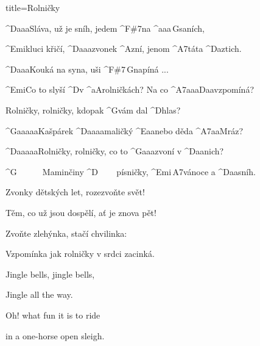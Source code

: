 \begin{song}{title=\predtitle\centering Rolničky \\\large   \vspace*{-0.3cm}}  %
\begin{centerjustified}
\nejnejvetsi

\sloka
	^{D{\color{white}aaa}}Sláva, už je sníh, jedem ^{F\#7}na ^{{\color{white}aaa}\,G}saních,

	^{Emi}kluci křičí, ^{D{\color{white}aaa}}zvonek ^{A}zní, jenom ^{A7}táta ^{D{\color{white}a}}ztich.

	^{D{\color{white}aaa}}Kouká na syna, uši ^{F\#7\,G}napíná ...

	^{Emi}Co to slyší ^{D}v ^{{\color{white}a}A}rolničkách? Na co ^{A7{\color{white}aaa}D{\color{white}aa}}vzpomíná?

	Rolničky, rolničky, kdopak ^{G}vám dal ^{D}hlas?

	^{G{\color{white}aaaaa}}Kašpárek ^{D{\color{white}aaaa}}maličký ^{E{\color{white}aa}}nebo děda ^{A7{\color{white}aa}}Mráz?

	^{D{\color{white}aaaaa}}Rolničky, rolničky, co to ^{G{\color{white}aaa}}zvoní v ^{D{\color{white}aa}}nich?

	^{G\,\,\,\,\,\,\,\,\,\,\,\,\,\,\,\,\,\,}Maminčiny ^{D\,\,\,\,\,\,\,\,\,\,\,\,\,}písničky, ^{Emi\,A7}vánoce a ^{D{\color{white}aa}}sníh.

\sloka
	Zvonky dětských let, rozezvoňte svět!

	Těm, co už jsou dospělí, ať je znova pět!

	Zvoňte zlehýnka, stačí chvilinka:

	Vzpomínka jak rolničky v srdci zacinká.

\sloka
	Jingle bells, jingle bells,

	Jingle all the way.

	Oh! what fun it is to ride

	in a one-horse open sleigh.


\end{centerjustified}
\setcounter{Slokočet}{0}
\end{song}

